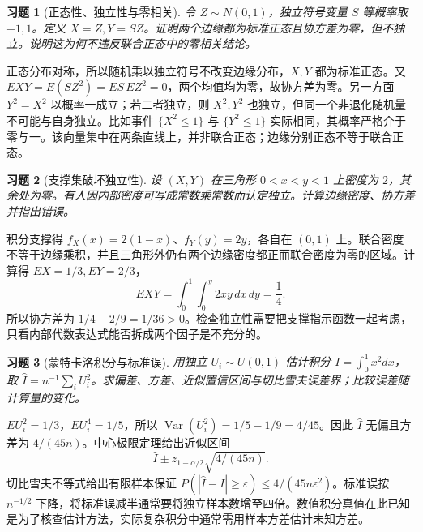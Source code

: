 \documentclass[12pt,fontset=fandol]{ctexart}
\newtheorem{exercise}{习题}[section]
\begin{document}
\begin{exercise}[正态性、独立性与零相关]\label{q:B17.15}
令 $Z\sim N(0,1)$，独立符号变量 $S$ 等概率取 $-1,1$。定义 $X=Z,Y=SZ$。证明两个边缘都为标准正态且协方差为零，但不独立。说明这为何不违反联合正态中的零相关结论。\par{}
\end{exercise}

\begin{solve}\label{a:B17.15}正态分布对称，所以随机乘以独立符号不改变边缘分布，$X,Y$ 都为标准正态。又 $EXY=E(SZ^2)=ES\,EZ^2=0$，两个均值均为零，故协方差为零。另一方面 $Y^2=X^2$ 以概率一成立；若二者独立，则 $X^2,Y^2$ 也独立，但同一个非退化随机量不可能与自身独立。比如事件 $\{X^2\le1\}$ 与 $\{Y^2\le1\}$ 实际相同，其概率严格介于零与一。该向量集中在两条直线上，并非联合正态；边缘分别正态不等于联合正态。\end{solve}

\begin{exercise}[支撑集破坏独立性]\label{q:B17.16}
设 $(X,Y)$ 在三角形 $0<x<y<1$ 上密度为 $2$，其余处为零。有人因内部密度可写成常数乘常数而认定独立。计算边缘密度、协方差并指出错误。\par{}
\end{exercise}

\begin{solve}\label{a:B17.16}积分支撑得 $f_X(x)=2(1-x)$、$f_Y(y)=2y$，各自在 $(0,1)$ 上。联合密度不等于边缘乘积，并且三角形外仍有两个边缘密度都正而联合密度为零的区域。计算得 $EX=1/3,EY=2/3$，\[EXY=\int_0^1\int_0^y2xy\,dx\,dy=\frac14.\]所以协方差为 $1/4-2/9=1/36>0$。检查独立性需要把支撑指示函数一起考虑，只看内部代数表达式能否拆成两个因子是不充分的。\end{solve}

\begin{exercise}[蒙特卡洛积分与标准误]\label{q:B17.17}
用独立 $U_i\sim U(0,1)$ 估计积分 $I=\int_0^1x^2dx$，取 $\widehat I=n^{-1}\sum_iU_i^2$。求偏差、方差、近似置信区间与切比雪夫误差界；比较误差随计算量的变化。\par{}
\end{exercise}

\begin{solve}\label{a:B17.17}$EU_i^2=1/3$，$EU_i^4=1/5$，所以 $\operatorname{Var}(U_i^2)=1/5-1/9=4/45$。因此 $\widehat I$ 无偏且方差为 $4/(45n)$。中心极限定理给出近似区间\[\widehat I\pm z_{1-\alpha/2}\sqrt{4/(45n)}.\]切比雪夫不等式给出有限样本保证 $P(|\widehat I-I|\ge\varepsilon)\le4/(45n\varepsilon^2)$。标准误按 $n^{-1/2}$ 下降，将标准误减半通常要将独立样本数增至四倍。数值积分真值在此已知是为了核查估计方法，实际复杂积分中通常需用样本方差估计未知方差。\end{solve}
\end{document}
